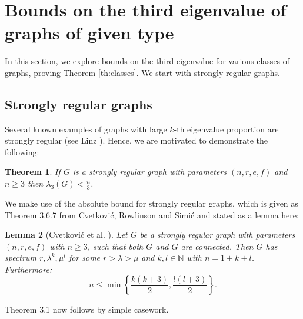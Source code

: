 \documentclass[12pt]{article}
\newtheorem{thm}{Theorem}[section]
\newtheorem{lmm}[thm]{Lemma}
\begin{document}
\section{Bounds on the third eigenvalue of graphs of given type}
In this section, we explore bounds on the third eigenvalue for various classes of graphs, proving Theorem \ref{th:classes}. We start with strongly regular graphs.
\subsection{Strongly regular graphs}
Several known examples of graphs with large $k$-th eigenvalue proportion are strongly regular (see Linz \cite{LinzImproved}). Hence, we are motivated to demonstrate the following:
\begin{thm}\label{thm:strreg}
If $G$ is a strongly regular graph with parameters $(n, r, e, f)$ and $n\ge 3$ then $\lambda_3(G) < \frac{n}{3}$.  
\end{thm}
We make use of the absolute bound for strongly regular graphs, which is given as Theorem 3.6.7 from Cvetković, Rowlinson and Simić \cite{SpectraTextbook} and stated as a lemma here:
\begin{lmm}[Cvetkovi\'{c} et al. \cite{SpectraTextbook}] \label{lmm:strreg}
    Let $G$ be a strongly regular graph with parameters $(n,r,e,f)$ with $n\ge 3$, such that both $G$ and $\bar{G}$ are connected. Then $G$ has spectrum $r, \lambda^{k}, \mu^{l}$ for some $r>\lambda>\mu$ and $k,l\in \mathbb{N}$ with $n=1+k+l$. Furthermore: \begin{equation*}
        n \le \min\left\{\frac{k(k+3)}{2}, \frac{l(l+3)}{2}\right\}.
    \end{equation*}
\end{lmm}
Theorem 3.1 now follows by simple casework.
\end{document}
